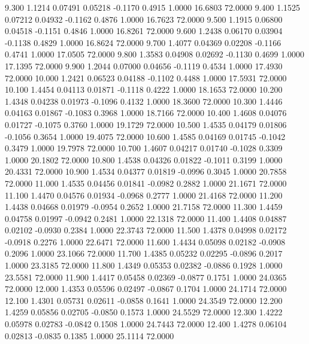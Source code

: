    9.300   1.1214   0.07491   0.05218  -0.1170   0.4915   1.0000  16.6803  72.0000
   9.400   1.1525   0.07212   0.04932  -0.1162   0.4876   1.0000  16.7623  72.0000
   9.500   1.1915   0.06800   0.04518  -0.1151   0.4846   1.0000  16.8261  72.0000
   9.600   1.2438   0.06170   0.03904  -0.1138   0.4829   1.0000  16.8624  72.0000
   9.700   1.4077   0.04369   0.02208  -0.1166   0.4741   1.0000  17.0505  72.0000
   9.800   1.3583   0.04908   0.02692  -0.1130   0.4699   1.0000  17.1395  72.0000
   9.900   1.2044   0.07000   0.04656  -0.1119   0.4534   1.0000  17.4930  72.0000
  10.000   1.2421   0.06523   0.04188  -0.1102   0.4488   1.0000  17.5931  72.0000
  10.100   1.4454   0.04113   0.01871  -0.1118   0.4222   1.0000  18.1653  72.0000
  10.200   1.4348   0.04238   0.01973  -0.1096   0.4132   1.0000  18.3600  72.0000
  10.300   1.4446   0.04163   0.01867  -0.1083   0.3968   1.0000  18.7166  72.0000
  10.400   1.4608   0.04076   0.01727  -0.1075   0.3760   1.0000  19.1729  72.0000
  10.500   1.4535   0.04179   0.01806  -0.1056   0.3654   1.0000  19.4075  72.0000
  10.600   1.4585   0.04169   0.01745  -0.1042   0.3479   1.0000  19.7978  72.0000
  10.700   1.4607   0.04217   0.01740  -0.1028   0.3309   1.0000  20.1802  72.0000
  10.800   1.4538   0.04326   0.01822  -0.1011   0.3199   1.0000  20.4331  72.0000
  10.900   1.4534   0.04377   0.01819  -0.0996   0.3045   1.0000  20.7858  72.0000
  11.000   1.4535   0.04456   0.01841  -0.0982   0.2882   1.0000  21.1671  72.0000
  11.100   1.4470   0.04576   0.01934  -0.0968   0.2777   1.0000  21.4168  72.0000
  11.200   1.4438   0.04668   0.01979  -0.0954   0.2652   1.0000  21.7158  72.0000
  11.300   1.4459   0.04758   0.01997  -0.0942   0.2481   1.0000  22.1318  72.0000
  11.400   1.4408   0.04887   0.02102  -0.0930   0.2384   1.0000  22.3743  72.0000
  11.500   1.4378   0.04998   0.02172  -0.0918   0.2276   1.0000  22.6471  72.0000
  11.600   1.4434   0.05098   0.02182  -0.0908   0.2096   1.0000  23.1066  72.0000
  11.700   1.4385   0.05232   0.02295  -0.0896   0.2017   1.0000  23.3185  72.0000
  11.800   1.4349   0.05353   0.02382  -0.0886   0.1928   1.0000  23.5581  72.0000
  11.900   1.4417   0.05458   0.02369  -0.0877   0.1751   1.0000  24.0365  72.0000
  12.000   1.4353   0.05596   0.02497  -0.0867   0.1704   1.0000  24.1714  72.0000
  12.100   1.4301   0.05731   0.02611  -0.0858   0.1641   1.0000  24.3549  72.0000
  12.200   1.4259   0.05856   0.02705  -0.0850   0.1573   1.0000  24.5529  72.0000
  12.300   1.4222   0.05978   0.02783  -0.0842   0.1508   1.0000  24.7443  72.0000
  12.400   1.4278   0.06104   0.02813  -0.0835   0.1385   1.0000  25.1114  72.0000

